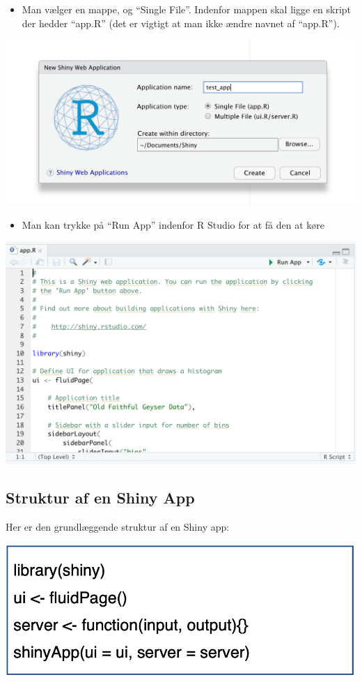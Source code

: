 \documentclass[
]{book}
\providecommand{\tightlist}{%
  \setlength{\itemsep}{0pt}\setlength{\parskip}{0pt}}
\begin{document}
\begin{itemize}
\tightlist
\item
  Man vælger en mappe, og ``Single File''. Indenfor mappen skal ligge en skript der hedder ``app.R'' (det er vigtigt at man ikke ændre navnet af ``app.R'').
\end{itemize}

\includegraphics[width=0.65\linewidth]{plots/shiny_directory}

\begin{itemize}
\tightlist
\item
  Man kan trykke på ``Run App'' indenfor R Studio for at få den at køre
\end{itemize}

\includegraphics[width=0.65\linewidth]{plots/shiny_run}

\hypertarget{struktur-af-en-shiny-app}{%
\subsection{Struktur af en Shiny App}\label{struktur-af-en-shiny-app}}

Her er den grundlæggende struktur af en Shiny app:

\includegraphics[width=0.55\linewidth]{plots/shiny_structure}
\end{document}
